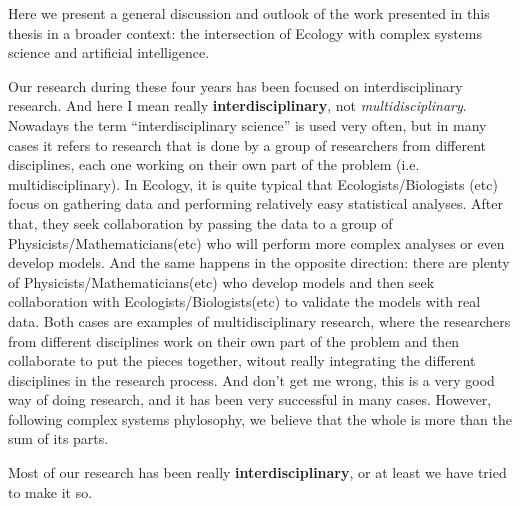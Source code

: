 
Here we present a general discussion and outlook of the work presented in this
thesis in a broader context: the intersection of Ecology with complex systems
science and artificial intelligence.

Our research during these four years has been focused on interdisciplinary
research. And here I mean really \textbf{interdisciplinary}, not
\textit{multidisciplinary}. Nowadays the term ``interdisciplinary science'' is
used very often, but in many cases it refers to research that is done by a
group of researchers from different disciplines, each one working on their own
part of the problem (i.e. multidisciplinary). In Ecology, it is quite typical
that Ecologists/Biologists (etc) focus on gathering data and performing
relatively easy statistical analyses. After that, they seek collaboration by
passing the data to a group of Physicists/Mathematicians(etc) who will perform
more complex analyses or even develop models. And the same happens in the
opposite direction: there are plenty of Physicists/Mathematicians(etc) who
develop models and then seek collaboration with Ecologists/Biologists(etc) to
validate the models with real data. Both cases are examples of
multidisciplinary research, where the researchers from different disciplines
work on their own part of the problem and then collaborate to put the pieces
together, witout really integrating the different disciplines in the research
process. And don't get me wrong, this is a very good way of doing research, and
it has been very successful in many cases. However, following complex systems
phylosophy, we believe that the whole is more than the sum of its parts.

Most of our research has been really \textbf{interdisciplinary}, or at least
we have tried to make it so.